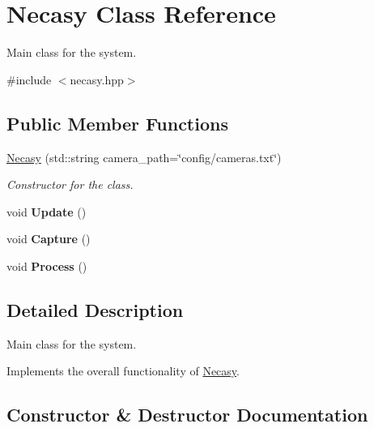 \hypertarget{classNecasy}{}\section{Necasy Class Reference}
\label{classNecasy}


Main class for the system.  




{\ttfamily \#include $<$necasy.\+hpp$>$}

\subsection*{Public Member Functions}
\begin{DoxyCompactItemize}
\item 
\hyperlink{classNecasy_ae023ff52c372884ce5124da00694794f}{Necasy} (std\+::string camera\+\_\+path=\char`\"{}config/cameras.\+txt\char`\"{})
\begin{DoxyCompactList}\small\item\em Constructor for the class. \end{DoxyCompactList}\item 
\mbox{\label{classNecasy_a1523acb7e5c251135d4c726803cb1cae}} 
void {\bfseries Update} ()
\item 
\mbox{\label{classNecasy_aa16df6361c43dad3c0078e8490daf3e1}} 
void {\bfseries Capture} ()
\item 
\mbox{\label{classNecasy_ac0d07b83d0925ea2b64e19ecefebaf5b}} 
void {\bfseries Process} ()
\end{DoxyCompactItemize}


\subsection{Detailed Description}
Main class for the system. 

Implements the overall functionality of \hyperlink{classNecasy}{Necasy}. 

\subsection{Constructor \& Destructor Documentation}
\mbox{\label{classNecasy_ae023ff52c372884ce5124da00694794f}} 
